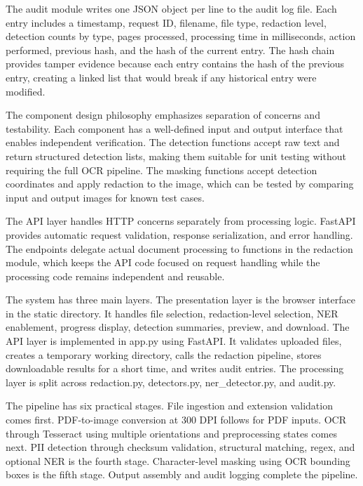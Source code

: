 The audit module writes one JSON object per line to the audit log file. Each entry includes a timestamp, request ID, filename, file type, redaction level, detection counts by type, pages processed, processing time in milliseconds, action performed, previous hash, and the hash of the current entry. The hash chain provides tamper evidence because each entry contains the hash of the previous entry, creating a linked list that would break if any historical entry were modified.

\bigskip

The component design philosophy emphasizes separation of concerns and testability. Each component has a well-defined input and output interface that enables independent verification. The detection functions accept raw text and return structured detection lists, making them suitable for unit testing without requiring the full OCR pipeline. The masking functions accept detection coordinates and apply redaction to the image, which can be tested by comparing input and output images for known test cases.

The API layer handles HTTP concerns separately from processing logic. FastAPI provides automatic request validation, response serialization, and error handling. The endpoints delegate actual document processing to functions in the redaction module, which keeps the API code focused on request handling while the processing code remains independent and reusable.

\bigskip

The system has three main layers. The presentation layer is the browser interface in the static directory. It handles file selection, redaction-level selection, NER enablement, progress display, detection summaries, preview, and download. The API layer is implemented in app.py using FastAPI. It validates uploaded files, creates a temporary working directory, calls the redaction pipeline, stores downloadable results for a short time, and writes audit entries. The processing layer is split across redaction.py, detectors.py, ner_detector.py, and audit.py.

The pipeline has six practical stages. File ingestion and extension validation comes first. PDF-to-image conversion at 300 DPI follows for PDF inputs. OCR through Tesseract using multiple orientations and preprocessing states comes next. PII detection through checksum validation, structural matching, regex, and optional NER is the fourth stage. Character-level masking using OCR bounding boxes is the fifth stage. Output assembly and audit logging complete the pipeline.

